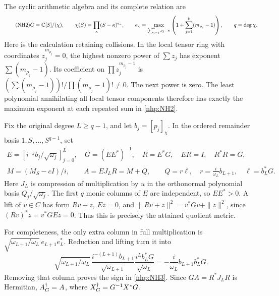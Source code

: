 The cyclic arithmetic algebra and its complete relation are
\begin{equation}\tag{NH2}\label{nhp:NH2}
C=\mathbb C[S]/(\chi),\qquad
\chi(S)=\prod_\kappa(S-\kappa)^{e_\kappa},\qquad
e_\kappa=\max_{\sum_{j=1}^k\rho_j=\kappa}
\left(1+\sum_{j=1}^k(m_{\rho_j}-1)\right),\qquad q=\deg\chi .
\end{equation}
Here is the calculation retaining collisions. In the local
tensor ring with coordinates \(z_j^{m_{\rho_j}}=0\),
the highest nonzero power of \(\sum z_j\) has exponent
\(\sum(m_{\rho_j}-1)\). Its coefficient on
\(\prod z_j^{m_{\rho_j}-1}\) is
\((\sum(m_{\rho_j}-1))!/\prod(m_{\rho_j}-1)!\ne0\).
The next power is zero. The least polynomial annihilating
all local tensor components therefore has exactly the
maximum exponent at each repeated sum in \eqref{nhp:NH2}.

Fix the original degree \(L\ge q-1\), and let \(b_j=[p_j]_\chi\).
In the ordered remainder basis \(1,S,\ldots,S^{q-1}\), set
\begin{equation}\tag{NH3}\label{nhp:NH3}
\begin{gathered}
E=[i^{-j}b_j/\sqrt{\omega_j}]_{j=0}^L,\quad
G=(EE^*)^{-1},\quad R=E^*G,\quad ER=I,\quad R^*R=G,\\
M=(M_S-cI)/i,\qquad
A=EJ_LR=M+Q,\qquad
Q=r\ell,\quad r=\frac{i}{\omega_L}b_{L+1},\quad
\ell=b_L^*G .
\end{gathered}
\end{equation}
Here \(J_L\) is compression of multiplication by \(u\)
in the orthonormal polynomial basis
\(Q_j/\sqrt{\omega_j}\).
The first \(q\) monic columns of \(E\) are independent,
so \(EE^*>0\). A lift of \(v\in C\) has form \(Rv+z\),
\(Ez=0\), and
\(\|Rv+z\|^2=v^*Gv+\|z\|^2\), since
\((Rv)^*z=v^*GEz=0\).
Thus this is precisely the attained quotient metric.

For completeness, the only extra column in full multiplication
is \(\sqrt{\omega_{L+1}/\omega_L}\,e_{L+1}e_L^*\).
Reduction and lifting turn it into
\[
\sqrt{\omega_{L+1}/\omega_L}\,
\frac{i^{-(L+1)}b_{L+1}}{\sqrt{\omega_{L+1}}}
\frac{i^Lb_L^*G}{\sqrt{\omega_L}}
=-\frac{i}{\omega_L}b_{L+1}b_L^*G .
\]
Removing that column proves the sign in \eqref{nhp:NH3}.
Since \(GA=R^*J_LR\) is Hermitian,
\(A^\dagger_G=A\), where \(X^\dagger_G=G^{-1}X^*G\).

